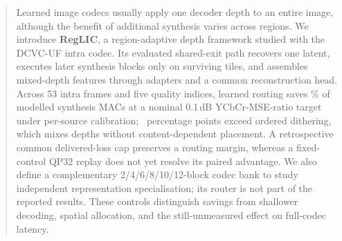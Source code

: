 \begin{abstract}
Learned image codecs usually apply one decoder depth to an entire image,
although the benefit of additional synthesis varies across regions.
We introduce \textbf{RegLIC}, a region-adaptive depth framework studied
with the DCVC-UF intra codec. Its evaluated shared-exit path recovers one
latent, executes later synthesis blocks only on surviving tiles, and
assembles mixed-depth features through adapters and a common
reconstruction head. Across 53 intra frames and five quality indices,
learned routing saves \MainRouterSaving\% of modelled synthesis MACs at
a nominal 0.1\,dB YCbCr-MSE-ratio target under per-source calibration;
\MainPremium\ percentage points exceed ordered dithering, which mixes
depths without content-dependent placement. A retrospective common
delivered-loss cap preserves a routing margin, whereas a fixed-control
QP32 replay does not yet resolve its paired advantage. We also define a
complementary 2/4/6/8/10/12-block codec bank to study independent
representation specialisation; its router is not part of the reported
results. These controls distinguish savings from shallower decoding,
spatial allocation, and the still-unmeasured effect on full-codec latency.
\end{abstract}
